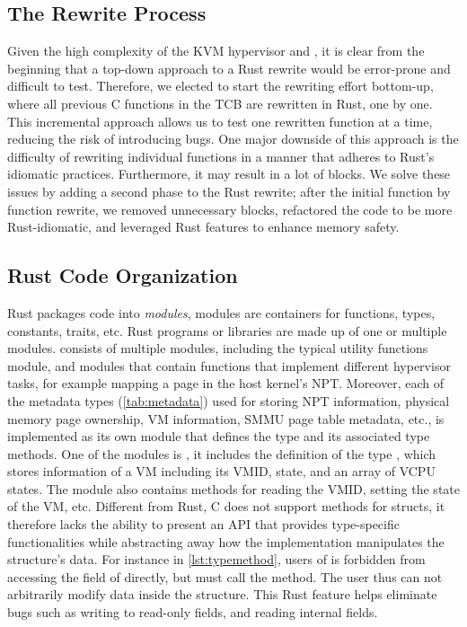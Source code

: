 \subsection{The Rewrite Process}
Given the high complexity of the KVM hypervisor and \secore{},
it is clear from the beginning that
a top-down approach to a Rust rewrite would be error-prone and difficult to test.
Therefore, we elected to start the rewriting effort bottom-up,
where all previous C functions in the TCB are rewritten in Rust, one by one.
This incremental approach allows us to test one rewritten function at a time,
reducing the risk of introducing bugs.
One major downside of this approach is the difficulty of rewriting individual
functions in a manner that adheres to Rust's idiomatic practices.
Furthermore, it may result in a lot of  blocks.
We solve these issues by adding a second phase to the Rust rewrite;
after the initial function by function rewrite, we removed unnecessary
 blocks, refactored the code to be more Rust-idiomatic,
and leveraged Rust features to enhance \rustcore{} memory safety.

\subsection{Rust Code Organization}
\label{sec:RCO}

Rust packages code into \textit{modules}, modules are containers for functions,
types, constants, traits, etc. Rust programs or libraries are made up of one or
multiple modules.
\rustcore{} consists of multiple modules, including the typical utility
functions module, and modules that contain functions that implement different
hypervisor tasks, for example mapping a page in the host kernel's NPT.
Moreover, each of the \rustcore{} metadata types (\autoref{tab:metadata}) used
for storing NPT information, physical memory page ownership, VM information,
SMMU page table metadata, etc., is implemented as its own module that defines
the type and its associated type methods.
One of the modules is , it includes the definition of the type
, which stores information of a VM including its VMID, state, and
an array of VCPU states. The module also contains methods for reading the VMID,
setting the state of the VM, etc.
Different from Rust, C does not support methods for structs, it therefore lacks
the ability to present an API that provides type-specific functionalities while
abstracting away how the implementation manipulates the structure's data.
For instance in \autoref{lst:typemethod}, users of  is forbidden
from accessing the  field of  directly, but must call
the  method. The user thus can not arbitrarily modify data
inside the structure. This Rust feature helps eliminate bugs such as writing to
read-only fields, and reading internal fields.


